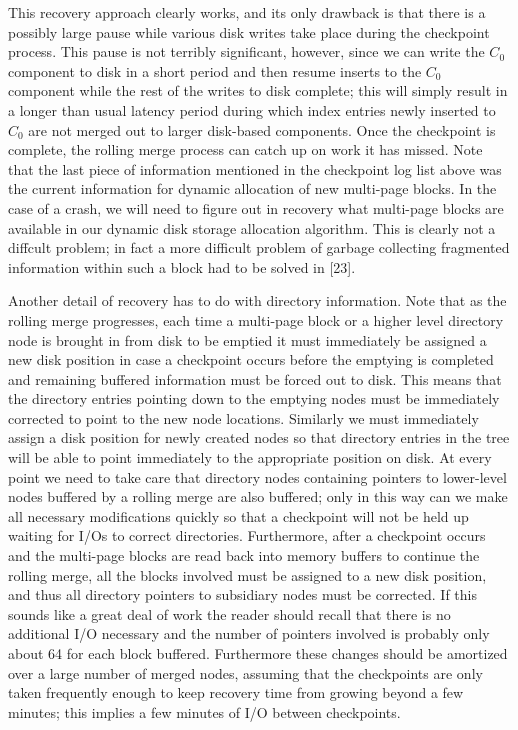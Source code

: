 \documentclass[a4paper,12pt,notitlepage,twoside,openright]{article}
\begin{document}
This recovery approach clearly works, and its only drawback is that
there is a possibly large pause while various disk writes take place
during the checkpoint process. This pause is not terribly significant,
however, since we can write the \(C_0\) component to disk in a short period
and then resume inserts to the \(C_0\) component while the rest of the writes
to disk complete; this will simply result in a longer than usual latency
period during which index entries newly inserted to \(C_0\) are not merged
out to larger disk-based components. Once the checkpoint is complete,
the rolling merge process can catch up on work it has missed. Note that
the last piece of information mentioned in the checkpoint log list above
was the current information for dynamic allocation of new multi-page
blocks. In the case of a crash, we will need to figure out in recovery
what multi-page blocks are available in our dynamic disk storage
allocation algorithm. This is clearly not a diffcult problem; in fact a
more difficult problem of garbage collecting fragmented information
within such a block had to be solved in {[}23{]}.

Another detail of recovery has to do with directory information. Note
that as the rolling merge progresses, each time a multi-page block or a
higher level directory node is brought in from disk to be emptied it
must immediately be assigned a new disk position in case a checkpoint
occurs before the emptying is completed and remaining buffered
information must be forced out to disk. This means that the directory
entries pointing down to the emptying nodes must be immediately
corrected to point to the new node locations. Similarly we must
immediately assign a disk position for newly created nodes so that
directory entries in the tree will be able to point immediately to the
appropriate position on disk. At every point we need to take care that
directory nodes containing pointers to lower-level nodes buffered by a
rolling merge are also buffered; only in this way can we make all
necessary modifications quickly so that a checkpoint will not be held up
waiting for I/Os to correct directories. Furthermore, after a checkpoint
occurs and the multi-page blocks are read back into memory buffers to
continue the rolling merge, all the blocks involved must be assigned to
a new disk position, and thus all directory pointers to subsidiary nodes
must be corrected. If this sounds like a great deal of work the reader
should recall that there is no additional I/O necessary and the number
of pointers involved is probably only about 64 for each block buffered.
Furthermore these changes should be amortized over a large number of
merged nodes, assuming that the checkpoints are only taken frequently
enough to keep recovery time from growing beyond a few minutes; this
implies a few minutes of I/O between checkpoints.
\end{document}
